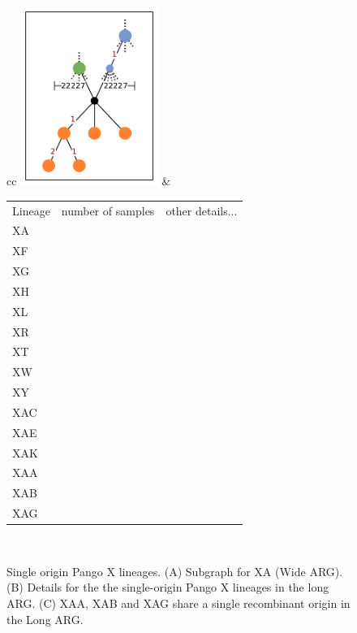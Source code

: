 \documentclass{article}
\begin{document}
\begin{figure}
\begin{tabularx}{\textwidth}{cc}
\includegraphics[width=0.4\textwidth]{figures/Pango_XA_nxcld_tight_graph.pdf}
&
\begin{tabular}[b]{llr}
Lineage & number of samples & other details... \\
XA & & \\
XF & & \\
XG & & \\
XH & & \\
XL & & \\
XR & & \\
XT & & \\
XW & & \\
XY & & \\
XAC & & \\
XAE & & \\
XAK & & \\
XAA & & \\
XAB & & \\
XAG & & \\
\end{tabular}\\
\end{tabularx}
\caption{Single origin Pango X lineages. (A) Subgraph for XA (Wide ARG).
(B) Details for the the single-origin Pango
X lineages in the long ARG. (C) XAA, XAB and XAG share a single recombinant
origin in the Long ARG. }
\end{figure}
\end{document}
